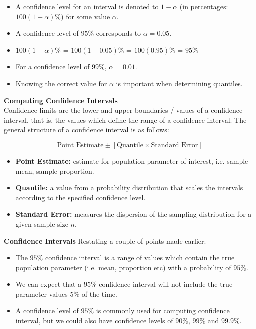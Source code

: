 \begin{itemize}
\item A confidence level for an interval is denoted to $1-\alpha$ (in percentages: $100(1-\alpha)\%$) for some value $\alpha$.
\item A confidence level of $95\%$ corresponds to $\alpha = 0.05$.
\item $100(1-\alpha)\%$ = $100(1-0.05)\%$  = $100(0.95)\%$ = $95\%$
\item For a confidence level of $99\%$, $\alpha = 0.01$.
\item Knowing the correct value for $\alpha$ is important when determining quantiles.
\end{itemize}

\begin{framed}

\noindent \textbf{Computing Confidence Intervals}\\
Confidence limits are the lower and upper boundaries / values of a confidence interval, that is, the values which define the range of a confidence interval. The general structure of a confidence interval is as follows:

\[ \mbox{Point Estimate}  \pm \left[ \mbox{Quantile} \times \mbox{Standard Error} \right] \]


\begin{itemize}
\item \textbf{Point Estimate:} estimate for population parameter of interest, i.e. sample mean, sample proportion.
\item \textbf{Quantile:} a value from a probability distribution that scales the intervals according to the specified confidence level.
\item \textbf{Standard Error:} measures the dispersion of the sampling distribution for a given sample size $n$.
\end{itemize}


\end{framed}



\textbf{Confidence Intervals  }
Restating a couple of points made earlier:
\begin{itemize}
\item The $95\%$ confidence interval is a range of values which contain the true population parameter (i.e. mean, proportion etc) with a probability of $95\%$.
\item We can expect that a $95\%$ confidence interval will not include the true parameter values $5\%$ of the time.
\item A confidence level of $95\%$ is commonly used for computing confidence interval, but we could also have confidence levels of $90\%$, $99\%$ and $99.9\%$.
\end{itemize}


